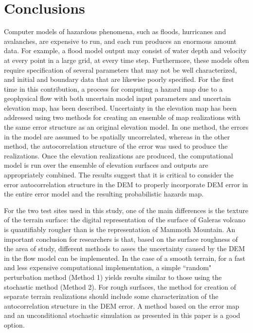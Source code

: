 \documentclass[12pt]{article}
\begin{document}
\section{Conclusions}

Computer models of hazardous phenomena, such as floods, hurricanes and avalanches, are 
 expensive to run, and each run produces an enormous amount data. For example, a flood 
model output may consist of water depth and velocity at every point in a large grid, at every   
time step. Furthermore, these models often require specification of several parameters that may not be 
well characterized, and initial and boundary data that are likewise poorly specified. 
For the first time in this contribution, a process for computing a hazard map due to a geophysical flow with both uncertain model
input parameters and uncertain elevation map, has been described. Uncertainty in the elevation map has been addressed using two methods for creating an ensemble of map realizations with the same error structure as an original elevation model.  In one method, the errors in the model are assumed to be spatially uncorrelated, whereas in the other method, the autocorrelation structure of the error was used to produce the realizations. Once the elevation realizations are produced, the computational model is run over the ensemble of elevation surfaces and outputs are appropriately combined.  The results suggest that it is critical to consider the error autocorrelation structure in the DEM to properly incorporate DEM error in the entire error model and the resulting probabilistic hazards map.

For the two test sites used in this study, one of the main differences is 
the texture of the terrain surface: the digital representation of the surface of Galeras volcano is quantifiably rougher than is the representation of Mammoth Mountain.
An important conclusion for researchers is that, based on the 
surface roughness of the area of study, different methods to asses the uncertainty caused by the DEM
in the flow model can be implemented. In the case of a smooth terrain, for a fast and 
less expensive computational implementation, a simple ``random" perturbation 
method (Method 1) yields results similar to those using the stochastic method (Method 2).
For rough surfaces, the method for creation of separate terrain realizations should include some characterization of the autocorrelation structure in the DEM error.  A 
method based on the error map and an unconditional stochastic simulation as 
presented in this paper is a good option.
\end{document}
